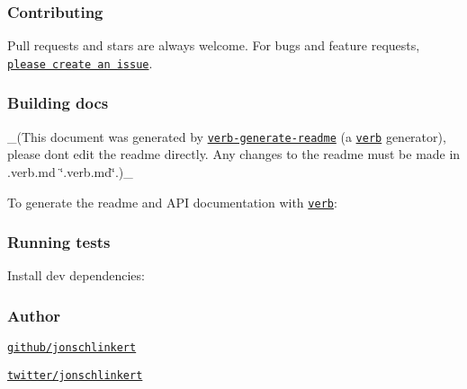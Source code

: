 {\ttfamily \subsubsection*{Contributing}}

{\ttfamily }

{\ttfamily Pull requests and stars are always welcome. For bugs and feature requests, \href{../../issues/new}{\tt please create an issue}.}

{\ttfamily \subsubsection*{Building docs}}

{\ttfamily }

{\ttfamily \+\_\+(This document was generated by \href{https://github.com/verbose/verb-generate-readme}{\tt verb-\/generate-\/readme} (a \href{https://github.com/verbose/verb}{\tt verb} generator), please don\textquotesingle{}t edit the readme directly. Any changes to the readme must be made in .verb.\+md \char`\"{}.\+verb.\+md\char`\"{}.)\+\_\+}

{\ttfamily To generate the readme and A\+PI documentation with \href{https://github.com/verbose/verb}{\tt verb}\+:}

{\ttfamily 
{}
}

{\ttfamily \subsubsection*{Running tests}}

{\ttfamily }

{\ttfamily Install dev dependencies\+:}

{\ttfamily 
{}
}

{\ttfamily \subsubsection*{Author}}

{\ttfamily }

{}

{\ttfamily 
\begin{DoxyItemize}
\item \href{https://github.com/jonschlinkert}{\tt github/jonschlinkert}
\item \href{http://twitter.com/jonschlinkert}{\tt twitter/jonschlinkert}
\end{DoxyItemize}}

